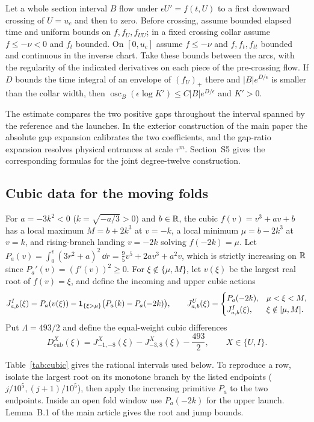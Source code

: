 \begin{lemma}\label{lem:terminal-distortion}
Let a whole section interval $B$ flow under $\epsilon U'=f(t,U)$ to a
first downward crossing of $U=u_c$ and then to zero. Before crossing,
assume bounded elapsed time and uniform bounds on $f,f_U,f_{UU}$;
in a fixed crossing collar assume $f\le-\nu<0$ and $f_t$ bounded.
On $[0,u_c]$ assume $f\le-\nu$ and $f,f_t,f_{tt}$ bounded and
continuous in the inverse chart. Take these bounds between the arcs,
with the regularity of the indicated derivatives on each piece of
the pre-crossing flow. If $D$ bounds the time integral of an envelope
of $(f_U)_+$ there and $|B|e^{D/\epsilon}$ is smaller than the
collar width, then $\operatorname{osc}_B(\epsilon\log K')\le
C|B|e^{D/\epsilon}$ and $K'>0$.
\end{lemma}
The estimate compares the two positive gaps throughout the interval
spanned by the reference and the launches. In the exterior construction
of the main paper the absolute gap expansion calibrates the two
coefficients, and the gap-ratio expansion resolves physical entrances
at scale $\tau^m$. Section~S5 gives the corresponding formulas for the
joint degree-twelve construction.

\subsection{Cubic data for the moving folds}
For $a=-3k^2<0$ ($k=\sqrt{-a/3}>0$) and $b\in\mathbb{R}$, the cubic $f(v)=v^3+av+b$ has a local maximum $M=b+2k^3$ at $v=-k$, a local minimum $\mu=b-2k^3$ at $v=k$, and rising-branch landing $v=-2k$ solving $f(-2k)=\mu$. Let $P_a(v)=\int_0^v (3r^2+a)^2\,\dd r=\tfrac95 v^5+2av^3+a^2v$, which is strictly increasing on $\mathbb{R}$ since $P_a'(v)=(f'(v))^2\ge 0$. For $\xi\notin\{\mu,M\}$, let $v(\xi)$ be the largest real root of $f(v)=\xi$, and define the incoming and upper cubic actions
\begin{equation}\label{eq:cubic-actions}
  J_{a,b}^I(\xi) = P_a(v(\xi)) - \mathbf{1}_{\{\xi>\mu\}}\big(P_a(k)-P_a(-2k)\big),\qquad
  J_{a,b}^U(\xi) = \begin{cases}
    P_a(-2k), & \mu<\xi<M,\\
    J_{a,b}^I(\xi), & \xi\notin[\mu,M].
  \end{cases}
\end{equation}
Put $\Lambda=493/2$ and define the equal-weight cubic differences
\begin{equation}\label{eq:D-cub}
  D_{\mathrm{cub}}^X(\xi) = J_{-1,-8}^X(\xi) - J_{-3,8}^X(\xi) - \frac{493}{2},\qquad X\in\{U,I\}.
\end{equation}

Table~\ref{tab:cubic} gives the rational intervals used below. To
reproduce a row, isolate the largest root on its monotone branch by
the listed endpoints ($j/10^5,(j+1)/10^5$), then apply the increasing primitive $P_a$ to the two
endpoints. Inside an open fold window use $P_a(-2k)$ for the upper
launch. Lemma~B.1 of the main article gives the root and jump bounds.


